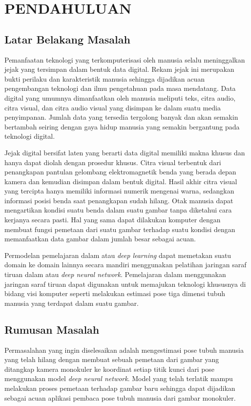 
\chapter{PENDAHULUAN}
\label{cha:1-Pendahuluan}

\section{Latar Belakang Masalah}
\label{sec:1-LatarBelakangMasalah}

Pemanfaatan teknologi yang terkomputerisasi oleh manusia selalu meninggalkan jejak yang
tersimpan dalam bentuk data digital. Rekam jejak ini merupakan bukti perilaku dan karakteristik
manusia  sehingga dijadikan acuan pengembangan teknologi dan ilmu pengetahuan pada masa mendatang.
Data digital yang umumnya dimanfaatkan oleh manusia meliputi teks, citra audio, citra visual, dan
citra audio visual yang disimpan ke dalam suatu media penyimpanan. Jumlah data yang tersedia
tergolong banyak dan akan semakin bertambah seiring dengan gaya hidup manusia yang semakin
bergantung pada teknologi digital.

Jejak digital bersifat laten yang berarti data digital memiliki makna khusus dan hanya dapat diolah
dengan prosedur khusus. Citra visual terbentuk dari penangkapan pantulan gelombang elektromagnetik
benda yang berada depan kamera dan kemudian disimpan dalam bentuk digital. Hasil akhir citra visual
yang tercipta hanya memiliki informasi numerik mengenai warna, sedangkan
informasi posisi benda saat penangkapan sudah hilang. Otak manusia dapat mengartikan kondisi suatu
benda dalam suatu gambar tanpa diketahui cara kerjanya secara pasti. Hal yang sama dapat
dilakukan komputer dengan membuat fungsi pemetaan dari suatu gambar terhadap suatu kondisi dengan
memanfaatkan data gambar dalam jumlah besar sebagai acuan.

Permodelan pemelajaran dalam atau \textit{deep learning} dapat memetakan suatu domain ke
domain lainnya secara mandiri menggunakan pelatihan jaringan saraf tiruan dalam atau
\textit{deep neural network}. Pemelajaran dalam menggunakan jaringan
saraf tiruan dapat digunakan untuk memajukan teknologi khususnya di bidang visi komputer
seperti melakukan estimasi pose tiga dimensi tubuh manusia yang terdapat dalam suatu gambar.

\section{Rumusan Masalah}
\label{sec:1-RumusanMasalah}
Permasalahan yang ingin diselesaikan adalah mengestimasi pose tubuh manusia yang
telah hilang dengan membuat sebuah pemetaan dari gambar yang ditangkap kamera monokuler ke
koordinat setiap titik kunci dari pose menggunakan model \textit{deep neural network}.
Model yang telah terlatik mampu melakukan proses
pemetaan terhadap gambar baru sehingga dapat dijadikan sebagai acuan aplikasi pembaca pose tubuh
manusia dari gambar monokuler.

